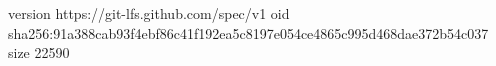 version https://git-lfs.github.com/spec/v1
oid sha256:91a388cab93f4ebf86c41f192ea5c8197e054ce4865c995d468dae372b54c037
size 22590
